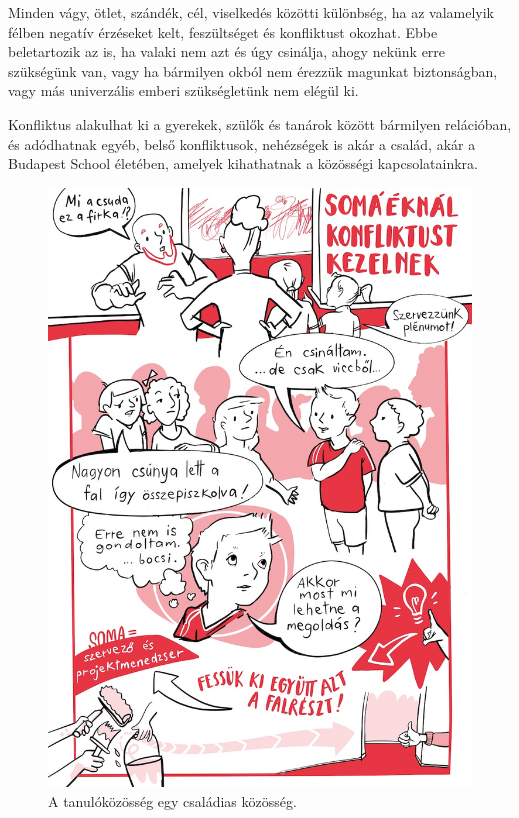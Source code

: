 Minden vágy, ötlet, szándék, cél, viselkedés közötti különbség, ha az
valamelyik félben negatív érzéseket kelt, feszültséget és konfliktust
okozhat. Ebbe beletartozik az is, ha valaki nem azt és úgy csinálja,
ahogy nekünk erre szükségünk van, vagy ha bármilyen okból nem érezzük
magunkat biztonságban, vagy más univerzális emberi szükségletünk
{\autocite{Rosenberg2003}} nem elégül ki.

Konfliktus alakulhat ki a gyerekek, szülők és tanárok között bármilyen
relációban, és adódhatnak egyéb, belső konfliktusok, nehézségek is akár
a család, akár a Budapest School életében, amelyek kihathatnak a
közösségi kapcsolatainkra.

\begin{figure}
\centering
\includegraphics{pics/5a_konfliktus.jpg}
\caption{A tanulóközösség egy családias közösség.}
\end{figure}

